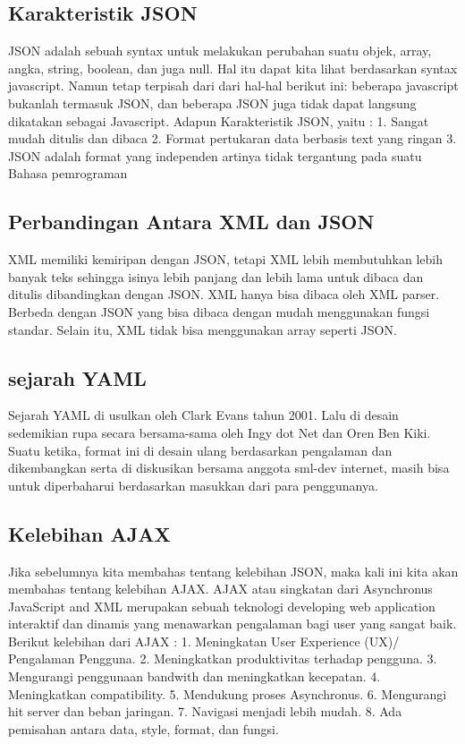 \documentclass[a4paper]{article}
\begin{document}
\subsection{Karakteristik JSON}
JSON adalah sebuah syntax untuk melakukan perubahan suatu objek, array, angka, string, boolean, dan juga null. Hal itu dapat kita lihat berdasarkan syntax javascript. Namun tetap terpisah dari dari hal-hal berikut ini: beberapa javascript bukanlah termasuk JSON, dan beberapa JSON juga tidak dapat langsung dikatakan sebagai Javascript. 
Adapun Karakteristik JSON, yaitu :
1.	Sangat mudah ditulis dan dibaca
2.	Format pertukaran data berbasis text yang ringan
3.	JSON adalah format yang independen artinya tidak tergantung pada suatu Bahasa pemrograman

\subsection{Perbandingan Antara XML dan JSON}
XML memiliki kemiripan dengan JSON, tetapi XML lebih membutuhkan lebih banyak teks sehingga isinya lebih panjang dan lebih lama untuk dibaca dan ditulis dibandingkan dengan JSON. XML hanya bisa dibaca oleh XML parser. Berbeda dengan JSON yang bisa dibaca dengan mudah menggunakan fungsi standar. Selain itu, XML tidak bisa menggunakan array seperti JSON.

\subsection{sejarah YAML}
Sejarah YAML di usulkan oleh Clark Evans tahun 2001. Lalu di desain sedemikian rupa secara bersama-sama oleh Ingy dot Net dan Oren Ben Kiki. Suatu ketika, format ini di desain ulang berdasarkan pengalaman dan dikembangkan serta di diskusikan bersama anggota sml-dev internet, masih bisa untuk diperbaharui berdasarkan masukkan dari para penggunanya.

\subsection{Kelebihan AJAX}
Jika sebelumnya kita membahas tentang kelebihan JSON, maka kali ini kita akan membahas tentang kelebihan AJAX. AJAX atau singkatan dari Asynchronus JavaScript and XML merupakan sebuah teknologi developing web application interaktif dan dinamis yang menawarkan pengalaman bagi user yang sangat baik. Berikut kelebihan dari AJAX :
1.	Meningkatan User Experience (UX)/ Pengalaman Pengguna.
2.	Meningkatkan produktivitas terhadap pengguna.
3.	Mengurangi penggunaan bandwith dan meningkatkan kecepatan.
4.	Meningkatkan compatibility.
5.	Mendukung proses Asynchronus.
6.	Mengurangi hit server dan beban jaringan.
7.	Navigasi menjadi lebih mudah.
8.	Ada pemisahan antara data, style, format, dan fungsi.
\end{document}
